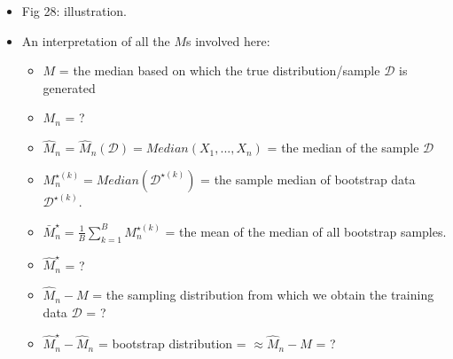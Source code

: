 \documentclass[norsk,a4paper,11pt]{article}
\begin{document}
\begin{itemize}
	\item Fig 28: illustration.
	\item An interpretation of all the $M$s involved here:
	\begin{itemize}
		\item $M$ = the median based on which the true distribution/sample $\mathcal{D}$ is generated
		\item $M_n$ = ?
		\item $\hat{M}_n$ = $\hat{M}_n (\mathcal{D}) = Median(X_1, ..., X_n)$ =  the median of the sample $\mathcal{D}$
		\item $M_n^{\star (k)} = Median(\mathcal{D}^{\star (k)})$ = the sample median of bootstrap data $\mathcal{D}^{\star (k)}$.
		\item $\bar{M}_n^\star = \frac{1}{B} \sum_{k=1}^B M_n^{\star (k)}$ = the mean of the median of all bootstrap samples.
		\item $\hat{M}_n^\star$ = ?
		\item $\hat{M}_n - M$ = the sampling distribution from which we obtain the training data $\mathcal{D}$ = ?
		\item  $\hat{M}_n^\star - \hat{M}_n$ = bootstrap distribution = $\approx \hat{M}_n - M$ = ?
	\end{itemize}
\end{itemize}
\end{document}
